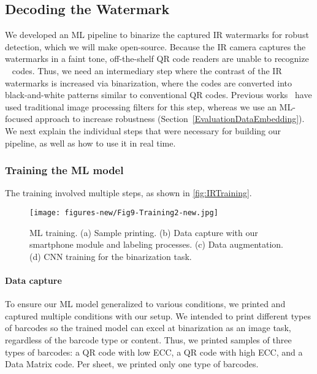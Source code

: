 \subsection{Decoding the Watermark}

We developed an ML pipeline to binarize the captured IR watermarks for robust detection, which we will make open-source. Because the IR camera captures the watermarks in a faint tone, off-the-shelf QR code readers are unable to recognize \systemName~ codes. Thus, we need an intermediary step where the contrast of the IR watermarks is increased via binarization, where the codes are converted into black-and-white patterns similar to conventional QR codes. Previous works~\cite{dogan_standarone_2023} have used traditional image processing filters for this step, whereas we use an ML-focused approach to increase robustness (Section~\ref{EvaluationDataEmbedding}). 
We next explain the individual steps that were necessary for building our pipeline, as well as how to use it in real time.


\subsubsection{Training the ML model}
\label{TrainingML}
The training involved multiple steps, as shown in \autoref{fig:IRTraining}.



\begin{figure*}[]
  \centering
  \texttt{[image: figures-new/Fig9-Training2-new.jpg]}
  \caption{ML training. (a) Sample printing. (b) Data capture with our smartphone module and labeling processes. (c) Data augmentation. (d) CNN training for the binarization task.}
  \label{fig:IRTraining}
\end{figure*}



\paragraph{Data capture}


To ensure our ML model generalized to various conditions, we printed and captured multiple conditions with our setup. We intended to print different types of barcodes so the trained model can excel at binarization as an image task, regardless of the barcode type or content. Thus, we printed samples of three types of barcodes: a QR code with low ECC, a QR code with high ECC, and a Data Matrix code. Per sheet, we printed only one type of barcodes.

